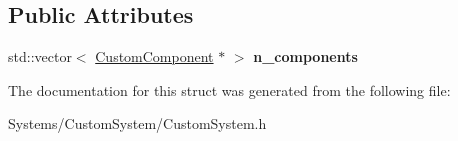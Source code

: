 \subsection*{Public Attributes}
\begin{DoxyCompactItemize}
\item 
\mbox{\label{structCustomCompNode_a96e3609cd8ee658e78951d46e968ef49}} 
std\+::vector$<$ \hyperlink{classCustomComponent}{Custom\+Component} $\ast$ $>$ {\bfseries n\+\_\+components}
\end{DoxyCompactItemize}


The documentation for this struct was generated from the following file\+:\begin{DoxyCompactItemize}
\item 
Systems/\+Custom\+System/Custom\+System.\+h\end{DoxyCompactItemize}
